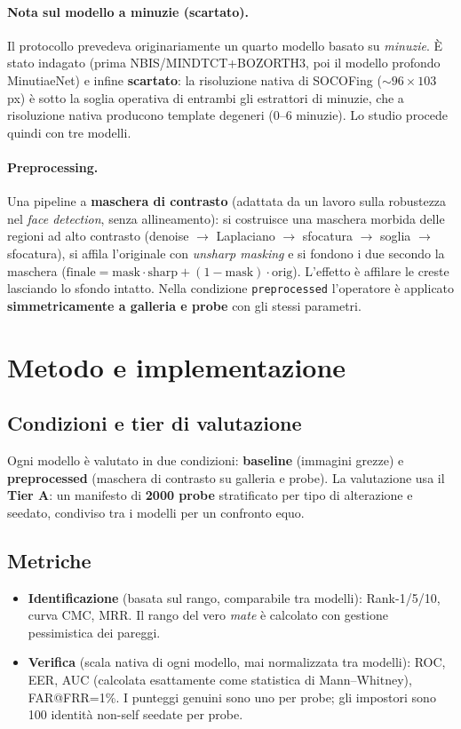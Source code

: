 \documentclass[11pt,a4paper]{article}
\begin{document}
\paragraph{Nota sul modello a minuzie (scartato).} Il protocollo prevedeva
originariamente un quarto modello basato su \emph{minuzie}. \`E stato indagato
(prima NBIS/MINDTCT+BOZORTH3, poi il modello profondo MinutiaeNet) e infine
\textbf{scartato}: la risoluzione nativa di SOCOFing (\(\sim\)\(96\times103\) px)
\`e sotto la soglia operativa di entrambi gli estrattori di minuzie, che a
risoluzione nativa producono template degeneri (0--6 minuzie). Lo studio procede
quindi con tre modelli.

\paragraph{Preprocessing.} Una pipeline a \textbf{maschera di contrasto} (adattata
da un lavoro sulla robustezza nel \emph{face detection}, senza allineamento):
si costruisce una maschera morbida delle regioni ad alto contrasto (denoise \(\to\)
Laplaciano \(\to\) sfocatura \(\to\) soglia \(\to\) sfocatura), si affila
l'originale con \emph{unsharp masking} e si fondono i due secondo la maschera
(\(\text{finale} = \text{mask}\cdot\text{sharp} + (1-\text{mask})\cdot\text{orig}\)).
L'effetto \`e affilare le creste lasciando lo sfondo intatto. Nella condizione
\texttt{preprocessed} l'operatore \`e applicato \textbf{simmetricamente a galleria
e probe} con gli stessi parametri.

\section{Metodo e implementazione}

\subsection{Condizioni e tier di valutazione}
Ogni modello \`e valutato in due condizioni: \textbf{baseline} (immagini grezze) e
\textbf{preprocessed} (maschera di contrasto su galleria e probe). La valutazione
usa il \textbf{Tier A}: un manifesto di \textbf{\num{2000} probe} stratificato per
tipo di alterazione e seedato, condiviso tra i modelli per un confronto equo.

\subsection{Metriche}
\begin{itemize}
  \item \textbf{Identificazione} (basata sul rango, comparabile tra modelli):
    Rank-1/5/10, curva CMC, MRR. Il rango del vero \emph{mate} \`e calcolato con
    gestione pessimistica dei pareggi.
  \item \textbf{Verifica} (scala nativa di ogni modello, mai normalizzata tra
    modelli): ROC, EER, AUC (calcolata esattamente come statistica di
    Mann--Whitney), FAR@FRR=1\%. I punteggi genuini sono uno per probe; gli
    impostori sono \num{100} identit\`a non-self seedate per probe.
\end{itemize}
\end{document}
